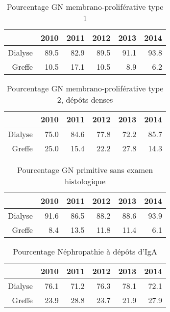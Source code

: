\documentclass[11pt,a4paper]{article}\usepackage[]{graphicx}\usepackage[]{color}
\begin{document}
\begin{table}[H]
\centering
\begin{tabular}{rrrrrr}
  \hline
 & 2010 & 2011 & 2012 & 2013 & 2014 \\ 
  \hline
Dialyse & 89.5 & 82.9 & 89.5 & 91.1 & 93.8 \\ 
  Greffe & 10.5 & 17.1 & 10.5 & 8.9 & 6.2 \\ 
   \hline
\end{tabular}
\caption{Pourcentage GN membrano-proliférative type 1} 
\end{table}
\begin{table}[H]
\centering
\begin{tabular}{rrrrrr}
  \hline
 & 2010 & 2011 & 2012 & 2013 & 2014 \\ 
  \hline
Dialyse & 75.0 & 84.6 & 77.8 & 72.2 & 85.7 \\ 
  Greffe & 25.0 & 15.4 & 22.2 & 27.8 & 14.3 \\ 
   \hline
\end{tabular}
\caption{Pourcentage GN membrano-proliférative type 2, dépôts denses} 
\end{table}
\begin{table}[H]
\centering
\begin{tabular}{rrrrrr}
  \hline
 & 2010 & 2011 & 2012 & 2013 & 2014 \\ 
  \hline
Dialyse & 91.6 & 86.5 & 88.2 & 88.6 & 93.9 \\ 
  Greffe & 8.4 & 13.5 & 11.8 & 11.4 & 6.1 \\ 
   \hline
\end{tabular}
\caption{Pourcentage GN primitive sans examen histologique} 
\end{table}
\begin{table}[H]
\centering
\begin{tabular}{rrrrrr}
  \hline
 & 2010 & 2011 & 2012 & 2013 & 2014 \\ 
  \hline
Dialyse & 76.1 & 71.2 & 76.3 & 78.1 & 72.1 \\ 
  Greffe & 23.9 & 28.8 & 23.7 & 21.9 & 27.9 \\ 
   \hline
\end{tabular}
\caption{Pourcentage Néphropathie à dépôts d'IgA} 
\end{table}
\end{document}
